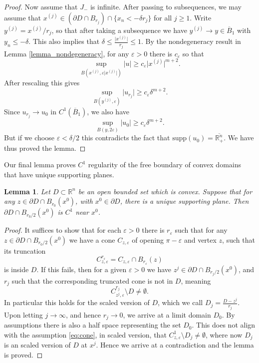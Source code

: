 \documentclass[11pt,a4paper]{amsart}
\newtheorem{Lemma}[Theorem]{Lemma}
\theoremstyle{definition}
\numberwithin{equation}{section}
\newcommand{\mR}{\mathbb{R}}                    %
\newcommand{\abs}[1]{\lvert #1 \rvert}          %
\newcommand{\ol}[1]{\overline{#1}}
\newcommand{\supp}{\mathrm{supp}}
\newcommand{\eps}{\varepsilon}
\newcommand{\p}{\partial}
\begin{document}
\begin{proof}
Now assume that $J_-$ is infinite. After passing to subsequences, we may assume that $x^{(j)} \in  (\p D \cap B_{r_j}) \cap \{  x_n < -\delta r_j \}$ for all $j \geq 1$. Write $y^{(j)} = x^{(j)}/r_j$, so that after taking a subsequence we have $y^{(j)} \to y \in \ol{B}_1$ with $y_n \leq -\delta$. This also implies that $\delta \leq \frac{\abs{x^{(j)}}}{r_j} \leq 1$. By the nondegeneracy result in Lemma \ref{lemma_nondegeneracy}, for any $\eps > 0$ there is $c_{\eps}$ so that 
\[
\sup_{B(x^{(j)}, \eps \abs{x^{(j)}})} \abs{u} \geq c_{\eps} \abs{x^{(j)}}^{m+2}.
\]
After rescaling this gives 
\[
\sup_{B(y^{(j)}, \eps)} \abs{u_{r_j}} \geq c_{\eps} \delta^{m+2}.
\]
Since $u_{r_j} \to u_0$ in $C^1(\ol{B}_1)$, we also have 
\[
\sup_{B(y, 2\eps)} \abs{u_0} \geq c_{\eps} \delta^{m+2}.
\]
But if we choose $\eps < \delta/2$ this contradicts the fact that $\supp(u_0) = \ol{\mR^n_+}$. We have thus proved the lemma.
\end{proof}

Our final lemma proves $C^1$ regularity of the free boundary of convex domains that have unique supporting planes.


\begin{Lemma} \label{lemma_convex_c1}
Let $D \subset \mR^n$ be an open bounded  set which is convex. Suppose that for any $z \in \p D \cap B_{r_0} (x^0)$, with  $x^0 \in \p D$, there is a unique supporting plane.
Then $\p D \cap B_{r_0/2} (x^0)$ is $C^1$ near $x^0$.
\end{Lemma}


\begin{proof}
It suffices to show that for each $\eps >0 $ there is $r_\eps $ such that for any $z \in \p D \cap B_{r_0/2} (x^0)$ we have a cone $C_{z,\eps }$ of opening $\pi - \eps $ and vertex $z$,   such that its   truncation
\[
C_{z,\eps }^{r_\eps } = C_{z, \eps }  \cap B_{r_\eps}(z)
\]
is inside $D$. If this fails, 
then for a given $\eps > 0$ 
we have  
$z^j \in \p D \cap B_{r_j/2} (x^0)$, and   $r_j$ such that the corresponding truncated cone is not in $D$, meaning  
\begin{equation}\label{eq:cone}
    C_{z^j,\eps }^{r_j } \setminus D \neq \emptyset. 
\end{equation}
In particular this holds for the scaled version of $D$, which we call $D_j = \frac{D - z^j}{r_j}$.
Upon letting $j \to \infty $, and hence $r_j \to 0$,  we arrive at a limit domain $D_0$. By assumptions there is also a half space representing the set $D_0$. This  does not align with the  assumption \eqref{eq:cone}, in scaled version, that $C_{z,\eps }^{1} \setminus D_j \neq \emptyset$, where now $D_j$ is an scaled version of $D$ at $x^j$. Hence we arrive at a contradiction and the lemma is proved. 
 \end{proof}
\end{document}
